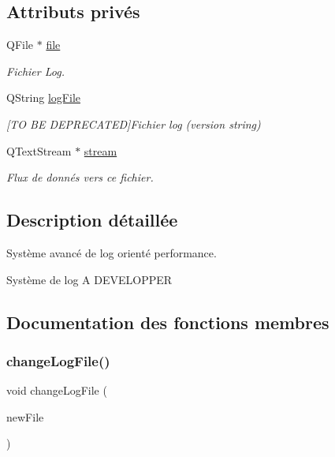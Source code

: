 \subsection*{Attributs privés}
\begin{DoxyCompactItemize}
\item 
\mbox{\label{classLoger_a125b00c9cda309940cdd1fe058d0aa68}} 
Q\+File $\ast$ \hyperlink{classLoger_a125b00c9cda309940cdd1fe058d0aa68}{file}
\begin{DoxyCompactList}\small\item\em Fichier Log. \end{DoxyCompactList}\item 
\mbox{\label{classLoger_a22b136611ecba20d5144be7cbab9cd32}} 
Q\+String \hyperlink{classLoger_a22b136611ecba20d5144be7cbab9cd32}{log\+File}
\begin{DoxyCompactList}\small\item\em \mbox{[}TO BE D\+E\+P\+R\+E\+C\+A\+T\+ED\mbox{]}Fichier log (version string) \end{DoxyCompactList}\item 
\mbox{\label{classLoger_ab0328576d77b27c2ecfb454de232def1}} 
Q\+Text\+Stream $\ast$ \hyperlink{classLoger_ab0328576d77b27c2ecfb454de232def1}{stream}
\begin{DoxyCompactList}\small\item\em Flux de donnés vers ce fichier. \end{DoxyCompactList}\end{DoxyCompactItemize}


\subsection{Description détaillée}
Système avancé de log orienté performance. 

Système de log A D\+E\+V\+E\+L\+O\+P\+P\+ER 

\subsection{Documentation des fonctions membres}
\mbox{\label{classLoger_a596151b92c56bbe8a487b81dcf3de698}} 
\subsubsection{\texorpdfstring{change\+Log\+File()}{changeLogFile()}}
{\footnotesize\ttfamily void change\+Log\+File (\begin{DoxyParamCaption}\item[{const Q\+String}]{new\+File }\end{DoxyParamCaption})\hspace{0.3cm}{\ttfamily [inline]}}



